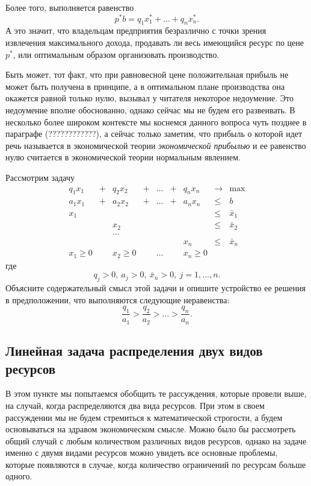     Более того, выполняется равенство
    \[p^{*}b=q_{1}x_{1}^{*}+\ldots+q_{n}x_{n}^{*}.\]
    А это значит, что владельцам предприятия
   безразлично с точки зрения извлечения максимального дохода,
   продавать ли весь имеющийся ресурс по цене $p^{*}$, или
   оптимальным образом организовать производство.

Быть может, тот факт, что при равновесной цене
    положительная прибыль не может быть получена в
    принципе, а в оптимальном плане производства она окажется равной только нулю,
    вызывал у читателя некоторое недоумение. Это недоумение вполне
    обоснованно, однако сейчас мы не будем его развеивать.
    В несколько более широком контексте
    мы коснемся данного вопроса чуть позднее в параграфе (????????????),
    а сейчас только заметим, что прибыль о которой идет речь
    называется в экономической теории \emph{экономической прибылью} и ее равенство нулю считается
    в экономической теории нормальным явлением.

\begin{exer}
    Рассмотрим задачу
    \[\begin{array}{ccccccccc}
        q_{1}x_{1} & + & q_{2}x_{2}  & + & \ldots & + & q_{n}x_{n}  & \rightarrow & \max \\
        a_{1}x_{1} & + & a_{2}x_{2}  & + & \ldots & + & a_{n}x_{n}& \leqslant & b \\
        x_{1} &  &  &  &  &  &  & \leqslant & \bar{x}_{1} \\
         &  & x_{2} &  &  &  &  & \leqslant & \bar{x}_{2} \\
         &  & \ldots &  &  &  &  &  &  \\
         &  &  &  &  &  & x_{n} & \leqslant & \bar{x}_{n} \\
        x_{1}\geqslant0 &  & x_{2}\geqslant0 &  & \ldots &  & x_{n}\geqslant0 &  &
      \end{array}
    \]
    где \[q_{j}>0, \ a_{j}>0, \ \bar{x}_{n}>0,  \ j=1,\ldots,n.\]
    Объясните содержательный смысл этой задачи и опишите устройство
    ее решения в предположении, что выполняются следующие неравенства:
    \[\frac{q_{1}}{a_{1}}>\frac{q_{2}}{a_{2}}>\ldots>\frac{q_{n}}{a_{n}}.\]
\end{exer}











\subsection{Линейная задача распределения двух видов ресурсов}
    В этом пункте мы попытаемся обобщить те рассуждения, которые
    провели выше, на случай, когда распределяются два вида ресурсов.
    При этом в своем рассуждении мы не будем стремиться
    к математической строгости, а будем основываться на здравом
    экономическом смысле. Можно было бы рассмотреть общий случай с
    любым количеством различных видов ресурсов, однако на задаче
    именно с двумя видами ресурсов можно увидеть все
    основные проблемы, которые появляются в случае, когда количество
    ограничений по ресурсам больше одного.


